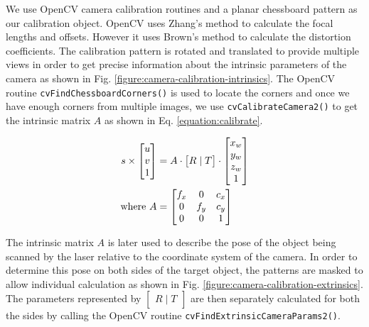 We use OpenCV camera calibration routines and a planar chessboard pattern as
our calibration object. OpenCV uses Zhang's method \cite{zhang:2000} to
calculate the focal lengths and offsets. However it uses Brown's method
\cite{brown:1971} to calculate the distortion coefficients. The calibration
pattern is rotated and translated to provide multiple views in order to get
precise information about the intrinsic parameters of the camera as shown in
Fig.  \ref{figure:camera-calibration-intrinsics}.  The OpenCV routine
\texttt{cvFindChessboardCorners()} is used to locate the corners and once we
have enough corners from multiple images, we use \texttt{cvCalibrateCamera2()}
to get the intrinsic matrix $A$ as shown in Eq. \ref{equation:calibrate}.

\begin{align}
	\label{equation:calibrate}
	s \times
	\begin{bmatrix}
		u \\ v \\	1 \\
	\end{bmatrix} &= A \cdot \begin{bmatrix}
															R \mid T
	 				  								\end{bmatrix}
										 \cdot \begin{bmatrix}
															x_w \\ y_w \\ z_w \\ 1
														\end{bmatrix} \\
	\text{where}~
	A &= \begin{bmatrix}
					f_x & 0 & c_x \\
					0 & f_y & c_y \\
					0 & 0 & 1 \\
 		 	 \end{bmatrix} \notag
\end{align}

The intrinsic matrix $A$ is later used to describe the pose of the object
being scanned by the laser relative to the coordinate system of the camera. In
order to determine this pose on both sides of the target object, the patterns
are masked to allow individual calculation as shown in Fig.
\ref{figure:camera-calibration-extrinsics}. The parameters represented by
$\begin{bmatrix}R \mid T\end{bmatrix}$ are then separately calculated for both
the sides by calling the OpenCV routine
\texttt{cvFindExtrinsicCameraParams2()}.

